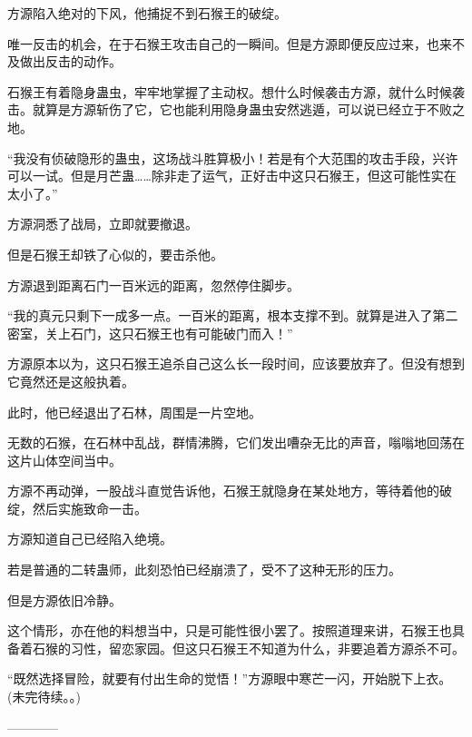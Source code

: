 \begin{this_body}
方源陷入绝对的下风，他捕捉不到石猴王的破绽。

唯一反击的机会，在于石猴王攻击自己的一瞬间。但是方源即便反应过来，也来不及做出反击的动作。

石猴王有着隐身蛊虫，牢牢地掌握了主动权。想什么时候袭击方源，就什么时候袭击。就算是方源斩伤了它，它也能利用隐身蛊虫安然逃遁，可以说已经立于不败之地。

“我没有侦破隐形的蛊虫，这场战斗胜算极小！若是有个大范围的攻击手段，兴许可以一试。但是月芒蛊……除非走了运气，正好击中这只石猴王，但这可能性实在太小了。”

方源洞悉了战局，立即就要撤退。

但是石猴王却铁了心似的，要击杀他。

方源退到距离石门一百米远的距离，忽然停住脚步。

“我的真元只剩下一成多一点。一百米的距离，根本支撑不到。就算是进入了第二密室，关上石门，这只石猴王也有可能破门而入！”

方源原本以为，这只石猴王追杀自己这么长一段时间，应该要放弃了。但没有想到它竟然还是这般执着。

此时，他已经退出了石林，周围是一片空地。

无数的石猴，在石林中乱战，群情沸腾，它们发出嘈杂无比的声音，嗡嗡地回荡在这片山体空间当中。

方源不再动弹，一股战斗直觉告诉他，石猴王就隐身在某处地方，等待着他的破绽，然后实施致命一击。

方源知道自己已经陷入绝境。

若是普通的二转蛊师，此刻恐怕已经崩溃了，受不了这种无形的压力。

但是方源依旧冷静。

这个情形，亦在他的料想当中，只是可能性很小罢了。按照道理来讲，石猴王也具备着石猴的习性，留恋家园。但这只石猴王不知道为什么，非要追着方源杀不可。

“既然选择冒险，就要有付出生命的觉悟！”方源眼中寒芒一闪，开始脱下上衣。(未完待续。。)

------------

\end{this_body}

